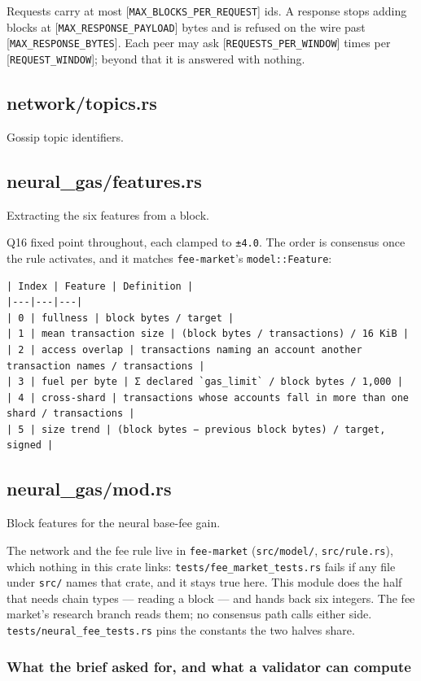 \documentclass[11pt,a4paper]{article}
\begin{document}
Requests carry at most [\texttt{MAX\_BLOCKS\_PER\_REQUEST}] ids. A response stops
adding blocks at [\texttt{MAX\_RESPONSE\_PAYLOAD}] bytes and is refused on the wire
past [\texttt{MAX\_RESPONSE\_BYTES}]. Each peer may ask [\texttt{REQUESTS\_PER\_WINDOW}] times
per [\texttt{REQUEST\_WINDOW}]; beyond that it is answered with nothing.

\subsection{network/topics.rs}
Gossip topic identifiers.

\subsection{neural\_gas/features.rs}
Extracting the six features from a block.

Q16 fixed point throughout, each clamped to \texttt{±4.0}. The order is
consensus once the rule activates, and it matches \texttt{fee-market}'s
\texttt{model::Feature}:

\begin{verbatim}
| Index | Feature | Definition |
|---|---|---|
| 0 | fullness | block bytes / target |
| 1 | mean transaction size | (block bytes / transactions) / 16 KiB |
| 2 | access overlap | transactions naming an account another transaction names / transactions |
| 3 | fuel per byte | Σ declared `gas_limit` / block bytes / 1,000 |
| 4 | cross-shard | transactions whose accounts fall in more than one shard / transactions |
| 5 | size trend | (block bytes − previous block bytes) / target, signed |
\end{verbatim}

\subsection{neural\_gas/mod.rs}
Block features for the neural base-fee gain.

The network and the fee rule live in \texttt{fee-market} (\texttt{src/model/},
\texttt{src/rule.rs}), which nothing in this crate links: \texttt{tests/fee\_market\_tests.rs}
fails if any file under \texttt{src/} names that crate, and it stays true here.
This module does the half that needs chain types — reading a block — and
hands back six integers. The fee market's research branch reads them; no
consensus path calls either side. \texttt{tests/neural\_fee\_tests.rs} pins the
constants the two halves share.

\subsubsection{What the brief asked for, and what a validator can compute}
\end{document}
